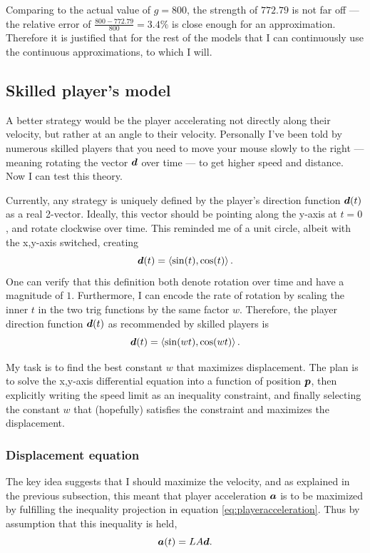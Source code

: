 Comparing to the actual value of $g=800$, the strength of $772.79$ is not far off --- the relative error of $\frac{800 - 772.79}{800} = 3.4\%$ is close enough for an approximation. Therefore it is justified that for the rest of the models that I can continuously use the continuous approximations, to which I will.

\subsection{Skilled player's model}
A better strategy would be the player accelerating not directly along their velocity, but rather at an angle to their velocity. Personally I've been told by numerous skilled players that you need to move your mouse slowly to the right --- meaning rotating the vector $\boldsymbol{d}$ over time --- to get higher speed and distance. Now I can test this theory.

Currently, any strategy is uniquely defined by the player's direction function $\boldsymbol{d}(t)$ as a real 2-vector. Ideally, this vector should be pointing along the y-axis at $t=0$, and rotate clockwise over time. This reminded me of a unit circle, albeit with the x,y-axis switched, creating
\[
    \boldsymbol{d}(t) = \left\langle \sin(t), \cos(t) \right\rangle.
\]
One can verify that this definition both denote rotation over time and have a magnitude of $1$. Furthermore, I can encode the rate of rotation by scaling the inner $t$ in the two trig functions by the same factor $w$. Therefore, the player direction function $\boldsymbol{d}(t)$ as recommended by skilled players is
\[
    \boldsymbol{d}(t) = \left\langle \sin(wt), \cos(wt) \right\rangle.
\]

My task is to find the best constant $w$ that maximizes displacement. The plan is to solve the x,y-axis differential equation into a function of position $\boldsymbol{p}$, then explicitly writing the speed limit as an inequality constraint, and finally selecting the constant $w$ that (hopefully) satisfies the constraint and maximizes the displacement.

\subsubsection{Displacement equation}
The key idea suggests that I should maximize the velocity, and as explained in the previous subsection, this meant that player acceleration $\boldsymbol{a}$ is to be maximized by fulfilling the inequality projection in equation \ref{eq:playeracceleration}. Thus by assumption that this inequality is held,
\[
    \boldsymbol{a}(t) = LA\boldsymbol{d}.
\]

